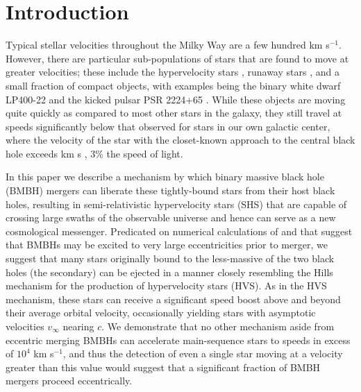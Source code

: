 \documentclass[a4paper,twocolumn]{emulateapj}
\begin{document}
\section{Introduction}
Typical stellar velocities throughout the Milky Way are a few hundred km s$^{-1}$. However, there are particular sub-populations of stars that are found to move at greater velocities; these include the hypervelocity stars \citep[$v \lesssim 700$ km/s][]{Brown:2011a}, runaway stars \citep[e.g.][]{Heber:2008a}, and a small fraction of compact objects, with examples being the binary white dwarf LP400-22 \citep[$v > 830$ km s$^{-1}$]{Kilic:2013a} and the kicked pulsar PSR 2224+65 \citep[$\approx 10^{3}$~km~s$^{-1}$,][]{Cordes:1993a}. While these objects are moving quite quickly as compared to most other stars in the galaxy, they still travel at speeds significantly below that observed for stars in our own galactic center, where the velocity of the star with the closet-known approach to the central black hole exceeds  km s \citep{Ghez:2005a}, 3\% the speed of light.

In this paper we describe a mechanism by which binary massive black hole (BMBH) mergers can liberate these tightly-bound stars from their host black holes, resulting in semi-relativistic hypervelocity stars (SHS) that are capable of crossing large swaths of the observable universe and hence can serve as a new cosmological messenger. Predicated on numerical calculations of \citet{Sesana:2010a} and \citet{Iwasawa:2011a} that suggest that BMBHs may be excited to very large eccentricities prior to merger, we suggest that many stars originally bound to the less-massive of the two black holes (the secondary) can be ejected in a manner closely resembling the Hills mechanism \citep{Hills:1988a} for the production of hypervelocity stars (HVS). As in the HVS mechanism, these stars can receive a significant speed boost above and beyond their average orbital velocity, occasionally yielding stars with asymptotic velocities $v_{\infty}$ nearing $c$. We demonstrate that no other mechanism aside from eccentric merging BMBHs can accelerate main-sequence stars to speeds in excess of $10^{4}$ km s$^{-1}$, and thus the detection of even a single star moving at a velocity greater than this value would suggest that a significant fraction of BMBH mergers proceed eccentrically. 
\end{document}
